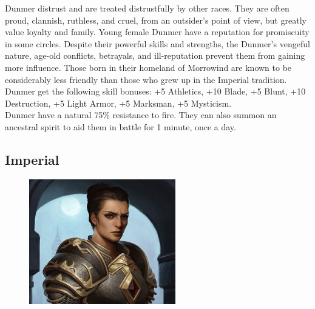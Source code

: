 \documentclass[12pt]{book}
\begin{document}
Dunmer distrust and are treated distrustfully by other races. They are often proud, clannish, ruthless, and cruel, from an outsider's point of view, but greatly value loyalty and family. Young female Dunmer have a reputation for promiscuity in some circles. Despite their powerful skills and strengths, the Dunmer's vengeful nature, age-old conflicts, betrayals, and ill-reputation prevent them from gaining more influence. Those born in their homeland of Morrowind are known to be considerably less friendly than those who grew up in the Imperial tradition.\\

Dunmer get the following skill bonuses: +5 Athletics, +10 Blade, +5 Blunt, +10 Destruction, +5 Light Armor, +5 Marksman, +5 Mysticism.\\

Dunmer have a natural 75\% resistance to fire. They can also summon an ancestral spirit to aid them in battle for 1 minute, once a day.

\newpage %
\subsection{Imperial}
\begin{figure}
	\includegraphics[width=\textwidth]{Imperial.png}
\end{figure}
\end{document}
